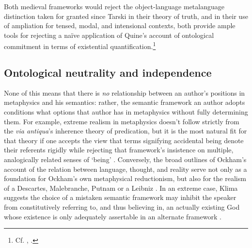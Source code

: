\documentclass[]{article}
\begin{document}
Both medieval frameworks would reject the object-language metalanguage distinction taken for granted since Tarski in their theory of truth, 
and 
in their use of ampliation for tensed, modal, and intensional contexts,
both provide ample tools for rejecting a na\"{i}ve application of Quine's account of ontological commitment in terms of existential quantification.\footnote{Cf. \autocite{Klima2004}, 
\autocite[171-174]{Klima2009}.}

\subsection{Ontological neutrality and independence}
None of this means that there is \emph{no} relationship between an author's positions in metaphysics and his semantics: 
rather, 
the semantic framework an author adopts conditions what options that author has in metaphysics without fully determining them. 
For example, extreme realism in metaphysics doesn't follow strictly from the \emph{via antiqua}'s inherence theory of predication, 
but it is the most natural fit for that theory 
if one accepts the view that terms signifying accidental being denote their referents rigidly 
while rejecting that framework's insistence on multiple, analogically related senses of `being' \autocite[125]{Klima1999}. 
Conversely, the broad outlines of Ockham's account of the relation between language, thought, and reality 
serve not only as a foundation for Ockham's own metaphysical reductionism, 
but also for the realism of a Descartes, Malebranche, Putnam or a Leibniz \autocite{Klima1991}. 
In an extreme case, Klima suggests the choice of a mistaken semantic framework may inhibit the speaker from constitutively referring to, 
and thus believing in, 
an actually existing God whose existence is only adequately assertable in an alternate framework \autocite[74]{Klima2008b}. %
\end{document}
